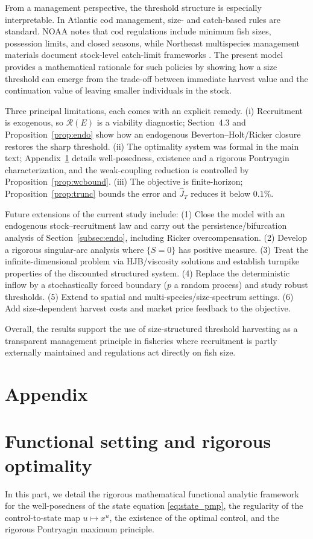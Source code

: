 \documentclass[pdflatex,sn-mathphys-num]{sn-jnl}
\newcommand{\R}{\mathcal{R}}
\theoremstyle{thmstyleone}
\theoremstyle{definition}
\theoremstyle{remark}
\begin{document}
From a management perspective, the threshold structure is especially
interpretable.
In Atlantic cod management, size- and catch-based rules are standard. NOAA notes that cod regulations include minimum fish sizes, possession limits, and closed seasons, while Northeast multispecies management materials document stock-level catch-limit frameworks \cite{tallack_regional_2009,noaa_fisheries_atlantic_2026,yu2026age}. 
The present model provides a mathematical rationale for such policies by
showing how a size threshold can emerge from the trade-off between immediate
harvest value and the continuation value of leaving smaller individuals in the
stock.

Three principal limitations, each comes with an explicit remedy.
(i) Recruitment is exogenous, so $\R(E)$ is a viability diagnostic; Section~4.3 and
Proposition~\ref{prop:endo} show how an endogenous Beverton--Holt/Ricker closure
restores the sharp threshold. (ii) The optimality system was formal in the main text; Appendix~\ref{appsec:functional} details well-posedness, existence and a rigorous Pontryagin characterization, and the weak-coupling reduction is controlled by
Proposition~\ref{prop:wcbound}. (iii) The objective is finite-horizon;
Proposition~\ref{prop:trunc} bounds the error and $\widehat J_T$ reduces it below
$0.1\%$.

Future extensions of the current study include:
(1) Close the model with an endogenous stock--recruitment law and
carry out the persistence/bifurcation analysis of Section~\ref{subsec:endo}, including Ricker
overcompensation. (2) Develop a rigorous singular-arc analysis where $\{S=0\}$ has
positive measure. (3) Treat the infinite-dimensional problem via HJB/viscosity
solutions and establish turnpike properties of the discounted structured system.
(4) Replace the deterministic inflow by a stochastically forced boundary
($p$ a random process) and study robust thresholds. (5) Extend to spatial and
multi-species/size-spectrum settings. (6) Add size-dependent harvest costs and
market price feedback to the objective.

Overall, the results support the use of size-structured threshold harvesting as
a transparent management principle in fisheries where recruitment is partly
externally maintained and regulations act directly on fish size. 

\appendix
\section*{Appendix}
\section{Functional setting and rigorous optimality}
\label{appsec:functional}
In this part, we detail the rigorous mathematical functional analytic framework for the well-posedness of the state equation \eqref{eq:state_pmp}, the regularity of the control-to-state map $u\mapsto x^u$, the existence of the optimal control, and the rigorous Pontryagin maximum principle.
\end{document}
